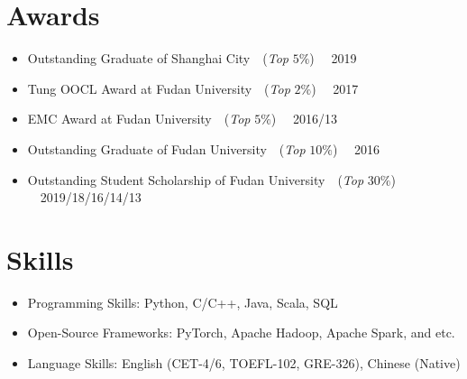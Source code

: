 \documentclass{resume}
\begin{document}
% 
% 

\section{Awards}
\begin{itemize}[parsep=0.5ex]
  \item Outstanding Graduate of Shanghai City\ \ (\textit{Top} $5\%$) \ \ \hfill 2019
  \item Tung OOCL Award at Fudan University\ \ (\textit{Top} $2\%$) \ \ \hfill 2017
  \item EMC Award at Fudan University\ \ (\textit{Top} $5\%$) \ \ \hfill 2016/13
  \item Outstanding Graduate of Fudan University\ \ (\textit{Top} $10\%$) \ \ \hfill 2016
  \item Outstanding Student Scholarship of Fudan University\ \ (\textit{Top} $30\%$) \ \ \hfill 2019/18/16/14/13
\end{itemize}

% 
% 

\section{Skills}
\begin{itemize}[parsep=0.5ex]
  \item Programming Skills: Python, C/C++, Java, Scala, SQL
  \item Open-Source Frameworks: PyTorch, Apache Hadoop, Apache Spark, and etc.
  \item Language Skills: English (CET-4/6, TOEFL-102, GRE-326), Chinese (Native)
\end{itemize}
\end{document}

